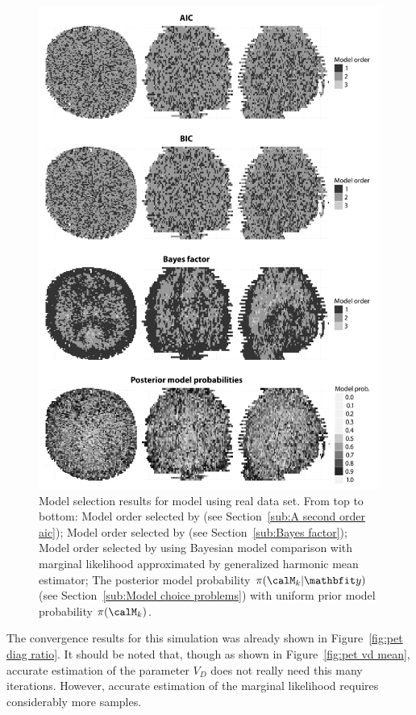 \begin{figure}
  \includegraphics[width=\linewidth]{fig/PET_MO}
  \caption[Model selection results for the \protect\pet compartmental model]
  {Model selection results for \pet model using real data set. From
    top to bottom: Model order selected by \aicc (see Section~\ref{sub:A
      second order aic}); Model order selected by \bic (see
    Section~\ref{sub:Bayes factor}); Model order selected by using Bayesian
    model comparison with marginal likelihood approximated by generalized
    harmonic mean estimator; The posterior model probability
    $\pi(\calM_k|\data)$ (see Section~\ref{sub:Model choice problems}) with
    uniform prior model probability $\pi(\calM_k)$.}
  \label{fig:pet mo}
\end{figure}

The convergence results for this simulation was already shown in
Figure~\ref{fig:pet diag ratio}. It should be noted that, though as shown in
Figure~\ref{fig:pet vd mean}, accurate estimation of the parameter $V_D$ does
not really need this many iterations. However, accurate estimation of the
marginal likelihood requires considerably more samples.

